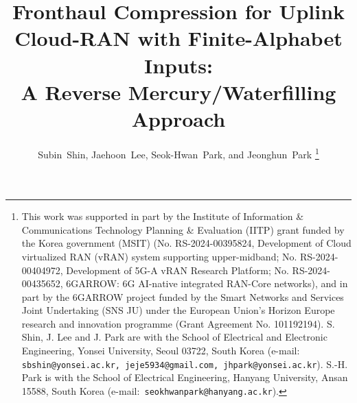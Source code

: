 \documentclass[10pt, twocolumn, comsoc]{IEEEtran}
\begin{document}
\title{Fronthaul Compression for Uplink Cloud-RAN with Finite-Alphabet Inputs:\\ A Reverse Mercury/Waterfilling Approach}


    \author{Subin~Shin, Jaehoon~Lee, Seok-Hwan~Park, and Jeonghun~Park
\thanks{
This work was supported in part by the Institute of Information \& Communications Technology Planning \& Evaluation (IITP) grant funded by the Korea government (MSIT) (No. RS-2024-00395824, Development of Cloud virtualized RAN (vRAN) system supporting upper-midband; No. RS-2024-00404972, Development of 5G-A vRAN Research Platform; No. RS-2024-00435652, 6GARROW: 6G AI-native integrated RAN-Core networks), and in part by the 6GARROW project funded by the Smart Networks and Services Joint Undertaking (SNS JU) under the European Union’s Horizon Europe research and innovation programme (Grant Agreement No. 101192194).
S. Shin, J. Lee and J. Park are with the School of Electrical and Electronic Engineering, Yonsei University, Seoul 03722, South Korea (e-mail:{\texttt{ sbshin@yonsei.ac.kr, jeje5934@gmail.com, jhpark@yonsei.ac.kr}}). 
S.-H. Park is with the School of Electrical Engineering, Hanyang University, Ansan 15588, South Korea (e-mail:{\texttt{ seokhwanpark@hanyang.ac.kr}}).
}
}
\end{document}
